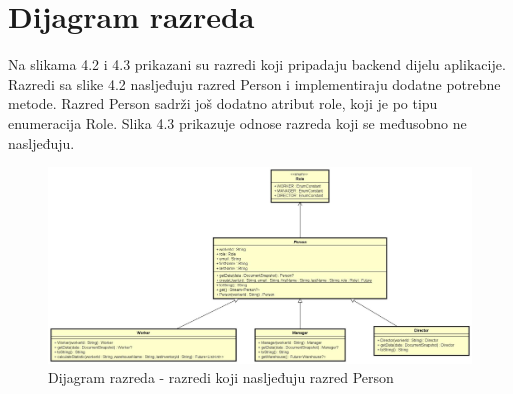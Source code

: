 			\eject
			
			
		\section{Dijagram razreda}
			

			
			Na slikama 4.2 i 4.3 prikazani su razredi koji pripadaju backend dijelu aplikacije. Razredi sa slike 4.2 nasljeđuju razred Person i implementiraju dodatne potrebne metode. Razred Person sadrži još dodatno atribut role, koji je po tipu enumeracija Role. Slika 4.3 prikazuje odnose razreda koji se međusobno ne nasljeđuju.
			\begin{figure}[H]
				\centering
				\includegraphics[width=1.0\linewidth]{"slike/Class Diagram0"}
				\caption{Dijagram razreda - razredi koji nasljeđuju razred Person}
				\label{Slika 4.2}
			\end{figure}
			
